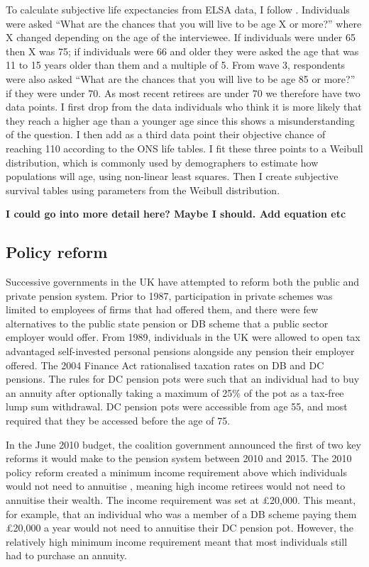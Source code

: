 \documentclass[12pt]{article}
\begin{document}
To calculate subjective life expectancies from ELSA data, I follow
\cite{odea_sturrock_rest_2023}. Individuals were asked “What are the chances
that you will live to be age X or more?” where X changed depending on the age of
the interviewee. If individuals were under 65 then X was 75; if individuals were
66 and older they were asked the age that was 11 to 15 years older than them and
a multiple of 5. From wave 3, respondents were also asked “What are the chances
that you will live to be age 85 or more?” if they were under 70. As most recent
retirees are under 70 we therefore have two data points. I first drop from the
data individuals who think it is more likely that they reach a higher age than a
younger age since this shows a misunderstanding of the question. I then add as a
third data point their objective chance of reaching 110 according to the ONS
life tables. I fit these three points to a Weibull distribution, which is
commonly used by demographers to estimate how populations will age, using
non-linear least squares. Then I create subjective survival tables using
parameters from the Weibull distribution.


\textbf{I could go into more detail here? Maybe I should. Add equation etc}


\subsection{Policy reform}

Successive governments in the UK have attempted to reform both the public and
private pension system. Prior to 1987, participation in private schemes was
limited to employees of firms that had offered them, and there were few
alternatives to the public state pension or DB scheme that a public sector
employer would offer. From 1989, individuals in the UK were allowed to open tax
advantaged self-invested personal pensions alongside any pension their employer
offered. The 2004 Finance Act rationalised taxation rates on DB and DC pensions.
The rules for DC pension pots were such that an individual had to buy an annuity
after optionally taking a maximum of 25\% of the pot as a tax-free lump sum
withdrawal. DC pension pots were accessible from age 55, and most required that
they be accessed before the age of 75.

In the June 2010 budget, the coalition government announced the first of two key
reforms it would make to the pension system between 2010 and 2015. The 2010
policy reform created a minimum income requirement above which individuals would
not need to annuitise \citep{finance_act_hmt_2011}, meaning high income
retirees would not need to annuitise their wealth. The income requirement was
set at £20,000. This meant, for example, that an individual who was a member of
a DB scheme paying them £20,000 a year would not need to annuitise their DC
pension pot. However, the relatively high minimum income requirement meant that
most individuals still had to purchase an annuity.
\end{document}

